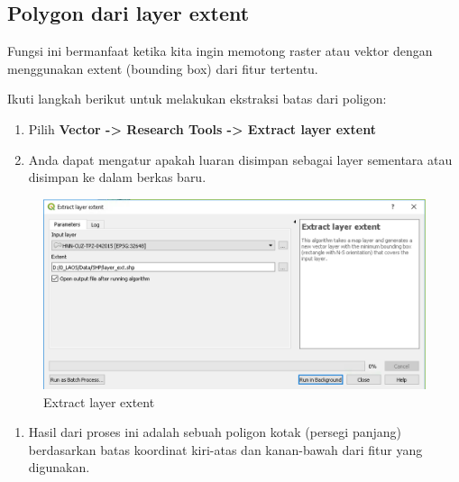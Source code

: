\documentclass[]{book}
\providecommand{\tightlist}{%
  \setlength{\itemsep}{0pt}\setlength{\parskip}{0pt}}
\begin{document}
\hypertarget{polygon-dari-layer-extent}{%
\subsection{Polygon dari layer extent}\label{polygon-dari-layer-extent}}

Fungsi ini bermanfaat ketika kita ingin memotong raster atau vektor dengan menggunakan extent (bounding box) dari fitur tertentu.

Ikuti langkah berikut untuk melakukan ekstraksi batas dari poligon:

\begin{enumerate}
\def\labelenumi{\arabic{enumi}.}
\item
  Pilih \textbf{Vector -\textgreater{} Research Tools -\textgreater{} Extract layer extent}
\item
  Anda dapat mengatur apakah luaran disimpan sebagai layer sementara atau disimpan ke dalam berkas baru.
\end{enumerate}

\begin{figure}

{\centering \includegraphics[width=0.7\linewidth]{images/04/fig22} 

}

\caption{Extract layer extent}\label{fig:fig1422}
\end{figure}

\begin{enumerate}
\def\labelenumi{\arabic{enumi}.}
\setcounter{enumi}{2}
\tightlist
\item
  Hasil dari proses ini adalah sebuah poligon kotak (persegi panjang) berdasarkan batas koordinat kiri-atas dan kanan-bawah dari fitur yang digunakan.
\end{enumerate}
\end{document}
